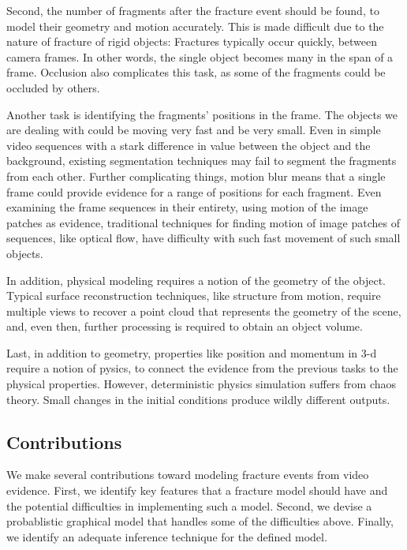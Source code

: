 \documentclass[runningheads]{llncs}
\begin{document}
Second, the number of fragments after the fracture event should be found, 
to model their geometry and motion accurately. This is made 
difficult due to the nature of fracture of rigid objects: Fractures typically 
occur quickly, between camera frames. In other words, the single object becomes 
many in the span of a frame. Occlusion also complicates this task, as some of 
the fragments could be occluded by others.

Another task is identifying the fragments’ positions in the frame. The objects 
we are dealing with could be moving very fast and be 
very small. Even in simple video sequences with a stark difference in value 
between the object and the background, existing segmentation techniques may fail 
to segment the fragments from each other. Further complicating 
things, motion blur 
means that a single frame could provide evidence for a range of positions for 
each fragment. Even examining the frame sequences in their entirety, using 
motion of the image patches as evidence, traditional techniques for finding motion of 
image patches of sequences, like optical flow, have 
difficulty with such fast movement of such small objects.

In addition, physical modeling requires a notion of the geometry of the object. Typical 
surface reconstruction techniques, like structure from motion, require multiple 
views to recover a point cloud that represents the geometry of the scene, and, 
even then, further processing is required to obtain an object volume.

Last, in addition to geometry, properties like position and momentum in 
3-d require a notion of pysics, to connect the evidence from the previous tasks 
to the physical properties. However, deterministic physics simulation suffers 
from chaos theory. Small changes in the initial conditions produce wildly 
different outputs.

\subsection{Contributions}

We make several contributions toward modeling fracture events from video 
evidence. First, we identify key features that a fracture model should have and 
the potential difficulties in implementing such a model. 
Second, we devise a probablistic graphical model that handles some of the 
difficulties above. Finally, we identify an adequate inference technique for 
the defined model.
\end{document}
